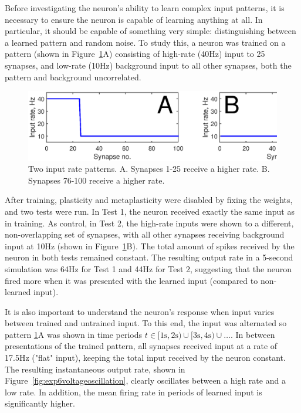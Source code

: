 \documentclass[a4paper,12pt]{report}
\theoremstyle{definition}
\begin{document}

Before investigating the neuron's ability to learn complex input patterns, it is necessary to ensure the neuron is capable of learning anything at all. In particular, it should be capable of something very simple: distinguishing between a learned pattern and random noise. To study this, a neuron was trained on a pattern (shown in Figure~\ref{fig:exp2_inputpatterns}A) consisting of high-rate (40Hz) input to 25 synapses, and low-rate (10Hz) background input to all other synapses, both the pattern and background uncorrelated.

\begin{figure}[h]
    \centering
    \includegraphics[width=\textwidth]{figures/exp2_inputpatterns.eps}
    \caption{Two input rate patterns. A. Synapses 1-25 receive a higher rate. B. Synapses 76-100 receive a higher rate.}
    \label{fig:exp2_inputpatterns}
\end{figure}

After training, plasticity and metaplasticity were disabled by fixing the weights, and two tests were run. In Test 1, the neuron received exactly the same input as in training. As control, in Test 2, the high-rate inputs were shown to a different, non-overlapping set of synapses, with all other synapses receiving background input at 10Hz (shown in Figure~\ref{fig:exp2_inputpatterns}B). The total amount of spikes received by the neuron in both tests remained constant. The resulting output rate in a 5-second simulation was 64Hz for Test 1 and 44Hz for Test 2, suggesting that the neuron fired more when it was presented with the learned input (compared to non-learned input).


It is also important to understand the neuron's response when input varies between trained and untrained input. To this end, the input was alternated so pattern \ref{fig:exp2_inputpatterns}A was shown in time periods $t \in [1\mathrm{s}, 2\mathrm{s}) \cup [3\mathrm{s}, 4\mathrm{s}) \cup \ldots $. In between presentations of the trained pattern, all synapses received input at a rate of 17.5Hz ("flat" input), keeping the total input received by the neuron constant. The resulting instantaneous output rate, shown in Figure~\ref{fig:exp6voltageoscillation}, clearly oscillates between a high rate and a low rate. In addition, the mean firing rate in periods of learned input is significantly higher.
\end{document}
